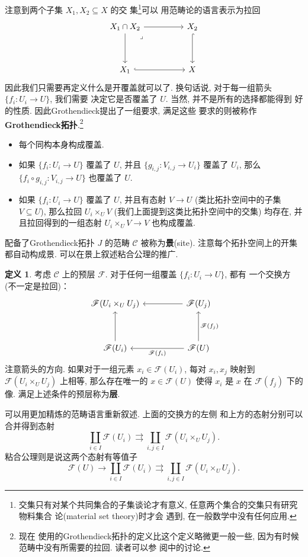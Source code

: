 \documentclass[UTF8]{ctexbook}
\theoremstyle{plain}
\theoremstyle{definition}
\newtheorem{definition}{定义}[chapter]
\theoremstyle{remark}
\begin{document}
注意到两个子集 \(X_1, X_2 \subseteq X\) 的交
集\footnote{交集只有对某个共同集合的子集谈论才有意义,
任意两个集合的交集只有研究物料集合
论(material set theory)时才会
遇到, 在一般数学中没有任何应用.}可以
用范畴论的语言表示为拉回
\[\begin{tikzcd}
{X_1 \cap X_2} && {X_2} \\
\\
{X_1} && X
\arrow[hook, from=3-1, to=3-3]
\arrow[hook, from=1-3, to=3-3]
\arrow[from=1-1, to=3-1]
\arrow[from=1-1, to=1-3]
\arrow["\lrcorner"{anchor=center, pos=0.125}, draw=none, from=1-1, to=3-3]
\end{tikzcd}\]
因此我们只需要再定义什么是开覆盖就可以了. 换句话说,
对于每一组箭头 \(\{f_i : U_i \to U\}\), 我们需要
决定它是否覆盖了 \(U\). 当然, 并不是所有的选择都能得到
好的性质. 因此Grothendieck提出了一组要求, 满足这些
要求的则被称作\textbf{Grothendieck拓扑}.\footnote{现在
使用的Grothendieck拓扑的定义比这个定义略微更一般一些,
因为有时候范畴中没有所需要的拉回. 读者可以参
阅\cite{johnstone:2008:elephant}中的讨论.}
\begin{itemize}
\item 每个同构本身构成覆盖.
\item 如果 \(\{f_i : U_i \to U\}\) 覆盖了 \(U\),
并且 \(\{g_{i,j} : V_{i,j} \to U_i\}\) 覆盖了 \(U_i\), 那么
\(\{f_i \circ g_{i,j} : V_{i,j} \to U\}\) 也覆盖了 \(U\).
\item 如果 \(\{f_i : U_i \to U\}\) 覆盖了 \(U\),
并且有态射 \(V \to U\) (类比拓扑空间中的子集 \(V \subseteq U\)),
那么拉回 \(U_i \times_U V\) (我们上面提到这类比拓扑空间中的交集)
均存在, 并且拉回得到的一组态射
\(U_i \times_U V \to V\) 也构成覆盖.
\end{itemize}
配备了Grothendieck拓扑 \(J\) 的范畴 \(\mathcal C\)
被称为\textbf{景}(site). 注意每个拓扑空间上的开集
都自动构成景. 可以在景上叙述粘合公理的推广.
\begin{definition}
考虑 \(\mathcal C\) 上的预层 \(\mathscr F\).
对于任何一组覆盖 \(\{f_i : U_i \to U\}\), 都有
一个交换方 (不一定是拉回)：
\[\begin{tikzcd}
{\mathscr F(U_i \times_U U_j)} && {\mathscr F(U_j)} \\
\\
{\mathscr F(U_i)} && {\mathscr F(U)}
\arrow["{\mathscr F(f_i)}", from=3-3, to=3-1]
\arrow["{\mathscr F(f_j)}"', from=3-3, to=1-3]
\arrow[from=3-1, to=1-1]
\arrow[from=1-3, to=1-1]
\end{tikzcd}\]
注意箭头的方向. 如果对于一组元素 \(x_i \in \mathscr F(U_i)\),
每对 \(x_i, x_j\) 映射到 \(\mathscr F(U_i \times_U U_j)\)
上相等, 那么存在唯一的 \(x \in \mathscr F(U)\) 使得
\(x_i\) 是 \(x\) 在 \(\mathscr F(f_j)\) 下的像.
满足上述条件的预层称为\textbf{层}.
\end{definition}
可以用更加精炼的范畴语言重新叙述. 上面的交换方的左侧
和上方的态射分别可以合并得到态射
\[\coprod_{i \in I} \mathscr F(U_i)
\rightrightarrows \coprod_{i,j \in I} \mathscr F(U_i \times_U U_j).\]
粘合公理则是说这两个态射有等值子
\[\mathscr F(U) \to \coprod_{i \in I} \mathscr F(U_i)
\rightrightarrows \coprod_{i,j \in I} \mathscr F(U_i \times_U U_j).\]
\end{document}
